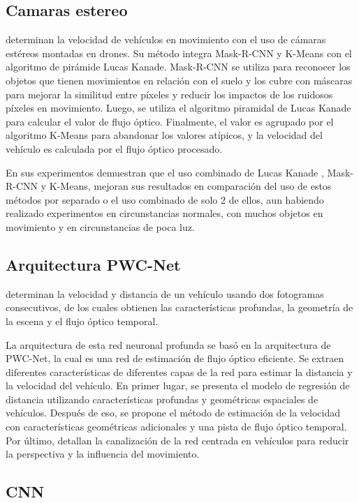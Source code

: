 \subsection{Camaras estereo}

\citeauthor{peng2019Improved} determinan la velocidad de vehículos en movimiento con el uso de cámaras estéreos montadas en drones. Su método integra Mask-R-CNN  y K-Means con el algoritmo de pirámide Lucas Kanade. Mask-R-CNN se utiliza para reconocer los objetos que tienen movimientos en relación con el suelo y los cubre con máscaras para mejorar la similitud entre píxeles y reducir los impactos de los ruidosos píxeles en movimiento. Luego, se utiliza el algoritmo piramidal de Lucas Kanade para calcular el valor de flujo óptico. Finalmente, el valor es agrupado por el algoritmo K-Means para abandonar los valores atípicos, y la velocidad del vehículo es calculada por el flujo óptico procesado.

En sus experimentos demuestran que el uso combinado de Lucas Kanade , Mask-R-CNN y K-Means, mejoran sus resultados en comparación del uso de estos métodos por separado o el uso combinado de solo 2 de ellos, aun habiendo realizado experimentos en circunstancias normales, con muchos objetos en movimiento y en circunstancias de poca luz.

\subsection{Arquitectura PWC-Net}

\citeauthor{song2020Learning} determinan la velocidad y distancia de un vehículo usando dos fotogramas consecutivos, de los cuales obtienen las  características profundas, la geometría de la escena y el flujo óptico temporal.

La arquitectura de esta red neuronal profunda se basó en la arquitectura de PWC-Net, la cual es una red de estimación de flujo óptico eficiente. Se extraen diferentes características de diferentes capas de la red para estimar la distancia y la velocidad del vehículo. En primer lugar, se presenta el modelo de regresión de distancia utilizando características profundas y geométricas espaciales de vehículos. Después de eso, se propone el método de estimación de la velocidad con características geométricas adicionales y una pista de flujo óptico temporal. Por último, detallan la canalización de la red centrada en vehículos para reducir la perspectiva y la influencia del movimiento.

\subsection{CNN}

